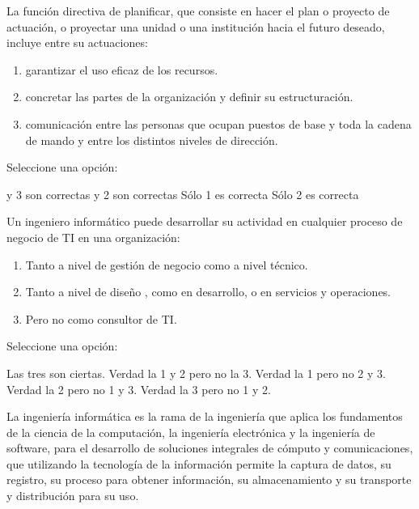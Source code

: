 \documentclass[a4paper,answers]{exam}
\begin{document}
\begin{questions}
  
\question La función directiva de planificar, que consiste en hacer
  el plan o proyecto de actuación, o proyectar una unidad o una
  institución hacia el futuro deseado, incluye entre su actuaciones:

  \begin{enumerate}
  \item garantizar el uso eficaz de los recursos.
  \item concretar las partes de la organización y definir su
    estructuración.
  \item comunicación entre las personas que ocupan puestos de base y
    toda la cadena de mando y entre los distintos niveles de
    dirección.
  \end{enumerate}

  
  Seleccione una opción:
  
  \begin{choices}
     y 3 son correctas
     y 2 son correctas
    \CorrectChoice Sólo 1 es correcta
    \choice Sólo 2 es correcta
  \end{choices}

  
\question Un ingeniero informático puede desarrollar su actividad en
  cualquier proceso de negocio de TI en una organización:

  \begin{enumerate}
  \item Tanto a nivel de gestión de negocio  como a nivel técnico.
  \item Tanto a nivel de diseño , como en desarrollo, o en servicios y operaciones.
  \item Pero no como consultor de TI.
  \end{enumerate}

  
  Seleccione una opción:
  
  \begin{choices}
    \choice Las tres son ciertas.
    \CorrectChoice Verdad la 1 y 2 pero no la 3.
    \choice Verdad  la 1 pero no  2 y 3.
    \choice Verdad  la  2 pero no 1 y 3.
    \choice Verdad la  3 pero no  1 y 2.
  \end{choices}

\question La ingeniería informática es la rama de la ingeniería que
  aplica los fundamentos de la ciencia de la computación, la
  ingeniería electrónica y la ingeniería de software, para el
  desarrollo de soluciones integrales de cómputo y comunicaciones, que
  utilizando la tecnología de la información permite la captura de
  datos, su registro, su proceso para obtener información, su
  almacenamiento y su transporte y distribución para su uso.


\end{questions}
\end{document}
